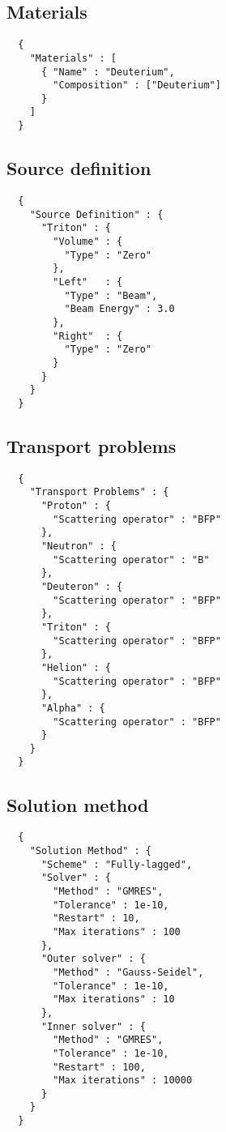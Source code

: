 \subsection{Materials}
\begin{verbatim}
  {
    "Materials" : [
      { "Name" : "Deuterium",
        "Composition" : ["Deuterium"]
      }
    ]
  }
\end{verbatim}

\subsection{Source definition}
\begin{verbatim}
  {
    "Source Definition" : { 
      "Triton" : {
        "Volume" : {
          "Type" : "Zero"
        },
        "Left"   : {
          "Type" : "Beam",
          "Beam Energy" : 3.0
        },
        "Right"  : {
          "Type" : "Zero"
        } 
      }
    }
  }
\end{verbatim}

\subsection{Transport problems}
\begin{verbatim}
  {
    "Transport Problems" : {
      "Proton" : {
        "Scattering operator" : "BFP"
      },
      "Neutron" : {
        "Scattering operator" : "B"
      },
      "Deuteron" : {
        "Scattering operator" : "BFP"
      },
      "Triton" : {
        "Scattering operator" : "BFP"
      },
      "Helion" : {
        "Scattering operator" : "BFP"
      },
      "Alpha" : {
        "Scattering operator" : "BFP"
      }
    }
  }
\end{verbatim}

\subsection{Solution method}
\begin{verbatim}
  {
    "Solution Method" : {
      "Scheme" : "Fully-lagged",
      "Solver" : {
        "Method" : "GMRES",
        "Tolerance" : 1e-10,
        "Restart" : 10,
        "Max iterations" : 100
      },
      "Outer solver" : {
        "Method" : "Gauss-Seidel",
        "Tolerance" : 1e-10,
        "Max iterations" : 10
      },
      "Inner solver" : {
        "Method" : "GMRES",
        "Tolerance" : 1e-10,
        "Restart" : 100,
        "Max iterations" : 10000
      }
    }
  }
\end{verbatim}

